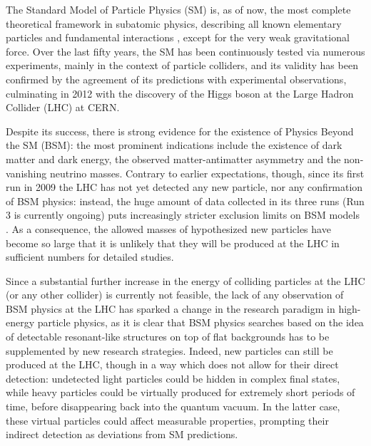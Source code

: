 
The Standard Model of Particle Physics (SM) is, as of now, the most complete theoretical framework in subatomic physics, describing all known elementary particles and fundamental interactions \cite{Glashow-1961, Salam-1964, Weinberg-1967, Fritzsch-1972, Fritzsch-1973, Higgs-1964-1, Higgs-1964-2, Englert-1964, Guralnik-1964}, except for the very weak gravitational force. Over the last fifty years, the SM has been continuously tested via numerous experiments, mainly in the context of particle colliders, and its validity has been confirmed by the agreement of its predictions with experimental observations, culminating in 2012 with the discovery of the Higgs boson \cite{ATLAS-2012, CMS-2012} at the Large Hadron Collider (LHC) at CERN.

Despite its success, there is strong evidence for the existence of Physics Beyond the SM (BSM): the most prominent indications include the existence of dark matter and dark energy, the observed matter-antimatter asymmetry and the non-vanishing neutrino masses. Contrary to earlier expectations, though, since its first run in 2009 the LHC has not yet detected any new particle, nor any confirmation of BSM physics: instead, the huge amount of data collected in its three runs (Run 3 is currently ongoing) puts increasingly stricter exclusion limits on BSM models \cite{CMS-ATLAS-SUSY, Bsekidt-2012, Ghosh-2025, Crivellin-2015}. As a consequence, the allowed masses of hypothesized new particles have become so large that it is unlikely that they will be produced at the LHC in sufficient numbers for detailed studies.

Since a substantial further increase in the energy of colliding particles at the LHC (or any other collider) is currently not feasible, the lack of any observation of BSM physics at the LHC has sparked a change in the research paradigm in high-energy particle physics, as it is clear that BSM physics searches based on the idea of detectable resonant-like structures on top of flat backgrounds has to be supplemented by new research strategies. Indeed, new particles can still be produced at the LHC, though in a way which does not allow for their direct detection: undetected light particles could be hidden in complex final states, while heavy particles could be virtually produced for extremely short periods of time, before disappearing back into the quantum vacuum. In the latter case, these virtual particles could affect measurable properties, prompting their indirect detection as deviations from SM predictions.
%

